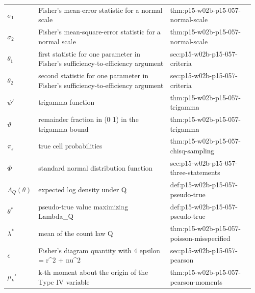 \begin{longtable}{@{}p{}p{}p{}@{}}
\(\sigma_1\) & Fisher's mean-error statistic for a normal scale & thm:\allowbreak{}p15-\allowbreak{}w02b-\allowbreak{}p15-\allowbreak{}057-\allowbreak{}normal-\allowbreak{}scale \\
\(\sigma_2\) & Fisher's mean-square-error statistic for a normal scale & thm:\allowbreak{}p15-\allowbreak{}w02b-\allowbreak{}p15-\allowbreak{}057-\allowbreak{}normal-\allowbreak{}scale \\
\(\theta_1\) & first statistic for one parameter in Fisher's sufficiency-to-efficiency argument & sec:\allowbreak{}p15-\allowbreak{}w02b-\allowbreak{}p15-\allowbreak{}057-\allowbreak{}criteria \\
\(\theta_2\) & second statistic for one parameter in Fisher's sufficiency-to-efficiency argument & sec:\allowbreak{}p15-\allowbreak{}w02b-\allowbreak{}p15-\allowbreak{}057-\allowbreak{}criteria \\
\(\psi'\) & trigamma function & thm:\allowbreak{}p15-\allowbreak{}w02b-\allowbreak{}p15-\allowbreak{}057-\allowbreak{}trigamma \\
\(\vartheta\) & remainder fraction in (0 1) in the trigamma bound & thm:\allowbreak{}p15-\allowbreak{}w02b-\allowbreak{}p15-\allowbreak{}057-\allowbreak{}trigamma \\
\(\pi_s\) & true cell probabilities & thm:\allowbreak{}p15-\allowbreak{}w02b-\allowbreak{}p15-\allowbreak{}057-\allowbreak{}chisq-\allowbreak{}sampling \\
\(\Phi\) & standard normal distribution function & sec:\allowbreak{}p15-\allowbreak{}w02b-\allowbreak{}p15-\allowbreak{}057-\allowbreak{}three-\allowbreak{}statements \\
\(\Lambda_Q(\theta)\) & expected log density under Q & def:\allowbreak{}p15-\allowbreak{}w02b-\allowbreak{}p15-\allowbreak{}057-\allowbreak{}pseudo-\allowbreak{}true \\
\(\theta^*\) & pseudo-true value maximizing Lambda\_Q & def:\allowbreak{}p15-\allowbreak{}w02b-\allowbreak{}p15-\allowbreak{}057-\allowbreak{}pseudo-\allowbreak{}true \\
\(\lambda^*\) & mean of the count law Q & thm:\allowbreak{}p15-\allowbreak{}w02b-\allowbreak{}p15-\allowbreak{}057-\allowbreak{}poisson-\allowbreak{}misspecified \\
\(\epsilon\) & Fisher's diagram quantity with 4 epsilon = r\^{}2 + nu\^{}2 & sec:\allowbreak{}p15-\allowbreak{}w02b-\allowbreak{}p15-\allowbreak{}057-\allowbreak{}pearson \\
\(\mu_k'\) & k-th moment about the origin of the Type IV variable & thm:\allowbreak{}p15-\allowbreak{}w02b-\allowbreak{}p15-\allowbreak{}057-\allowbreak{}pearson-\allowbreak{}moments \\

\end{longtable}
